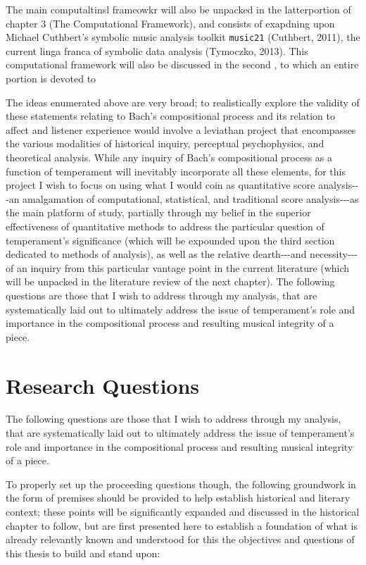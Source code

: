 The main computaltinsl frameowkr will also be unpacked in the
latterportion of chapter 3 (The Computational Framework), and consists
of exapdning upon Michael Cuthbert's symbolic music analysis toolkit
\texttt{music21} (Cuthbert, 2011), the current linga franca of symbolic
data analysis (Tymoczko, 2013). This computational framework will also
be discussed in the second , to which an entire portion is devoted to

The ideas enumerated above are very broad; to realistically explore the
validity of these statements relating to Bach's compositional process
and its relation to affect and listener experience would involve a
leviathan project that encompasses the various modalities of historical
inquiry, perceptual psychophysics, and theoretical analysis. While any
inquiry of Bach's compositional process as a function of temperament
will inevitably incorporate all these elements, for this project I wish
to focus on using what I would coin as quantitative score
analysis-\/-\/-an amalgamation of computational, statistical, and
traditional score analysis-\/-\/-as the main platform of study,
partially through my belief in the superior effectiveness of
quantitative methods to address the particular question of temperament's
significance (which will be expounded upon the third section dedicated
to methods of analysis), as well as the relative dearth-\/-\/-and
necessity-\/-\/-of an inquiry from this particular vantage point in the
current literature (which will be unpacked in the literature review of
the next chapter). The following questions are those that I wish to
address through my analysis, that are systematically laid out to
ultimately address the issue of temperament's role and importance in the
compositional process and resulting musical integrity of a piece.

    \section{Research Questions}\label{research-questions}

The following questions are those that I wish to address through my
analysis, that are systematically laid out to ultimately address the
issue of temperament's role and importance in the compositional process
and resulting musical integrity of a piece.

To properly set up the proceeding questions though, the following
groundwork in the form of premises should be provided to help establish
historical and literary context; these points will be significantly
expanded and discussed in the historical chapter to follow, but are
first presented here to establish a foundation of what is already
relevantly known and understood for this the objectives and questions of
this thesis to build and stand upon:

